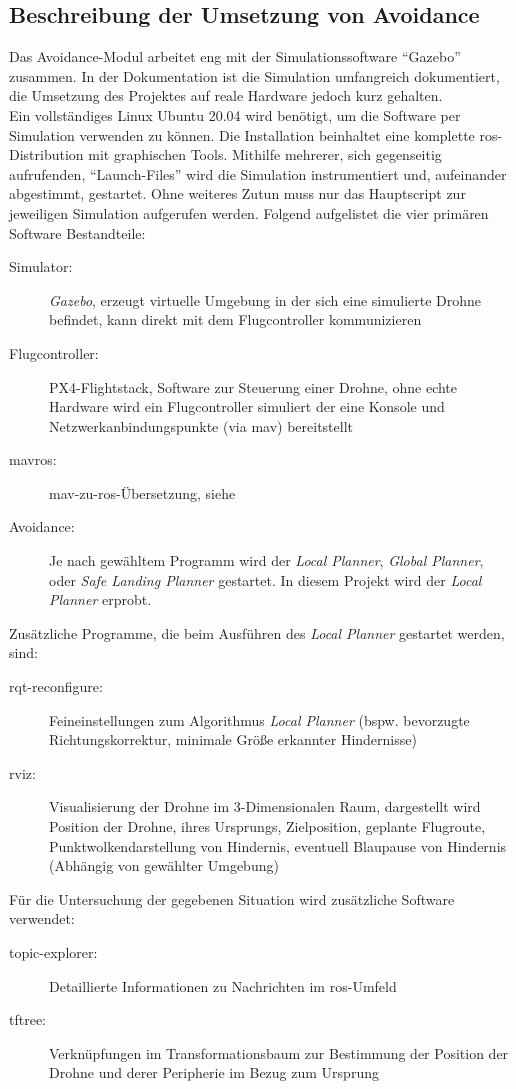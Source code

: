 \subsection{Beschreibung der Umsetzung von Avoidance}
Das Avoidance-Modul arbeitet eng mit der Simulationssoftware \enquote{Gazebo} zusammen. In der Dokumentation \cite{dronecodestiftungObstacleDetectionAvoidance2023} ist die Simulation umfangreich dokumentiert, die Umsetzung des Projektes auf reale Hardware jedoch kurz gehalten.\\
Ein vollständiges Linux Ubuntu 20.04 wird benötigt, um die Software per Simulation verwenden zu können. Die Installation beinhaltet eine komplette \acrshort{ros}-Distribution mit graphischen Tools. Mithilfe mehrerer, sich gegenseitig aufrufenden, \enquote{Launch-Files} wird die Simulation instrumentiert und, aufeinander abgestimmt, gestartet. Ohne weiteres Zutun muss nur das Hauptscript zur jeweiligen Simulation aufgerufen werden. Folgend aufgelistet die vier primären Software Bestandteile:
\begin{description}
    \item[Simulator:] \textit{Gazebo}, erzeugt virtuelle Umgebung in der sich eine simulierte Drohne befindet, kann direkt mit dem Flugcontroller kommunizieren
    \item[Flugcontroller:] PX4-Flightstack, Software zur Steuerung einer Drohne, ohne echte Hardware wird ein Flugcontroller simuliert der eine Konsole und Netzwerkanbindungspunkte (via \acrshort{mav}) bereitstellt
    \item[mavros:] \acrshort{mav}-zu-\acrshort{ros}-Übersetzung, siehe \cite[Kapitel 5.2]{markusreinErweiterungBestehenderDrohnen2023}
    \item[Avoidance:] Je nach gewähltem Programm wird der \textit{Local Planner}, \textit{Global Planner}, oder \textit{Safe Landing Planner} gestartet. In diesem Projekt wird der \textit{Local Planner} erprobt.
\end{description}
Zusätzliche Programme, die beim Ausführen des \textit{Local Planner} gestartet werden, sind:
\begin{description}
    \item[rqt-reconfigure:] Feineinstellungen zum Algorithmus \textit{Local Planner} (bspw. bevorzugte Richtungskorrektur, minimale Größe erkannter Hindernisse)
    \item[rviz:] Visualisierung der Drohne im 3-Dimensionalen Raum, dargestellt wird Position der Drohne, ihres Ursprungs, Zielposition, geplante Flugroute, Punktwolkendarstellung von Hindernis, eventuell Blaupause von Hindernis (Abhängig von gewählter Umgebung)
\end{description}
Für die Untersuchung der gegebenen Situation wird zusätzliche Software verwendet:
\begin{description}
    \item[topic-explorer:] Detaillierte Informationen zu Nachrichten im \acrshort{ros}-Umfeld
    \item[tftree:] Verknüpfungen im Transformationsbaum zur Bestimmung der Position der Drohne und derer Peripherie im Bezug zum Ursprung 
\end{description}

